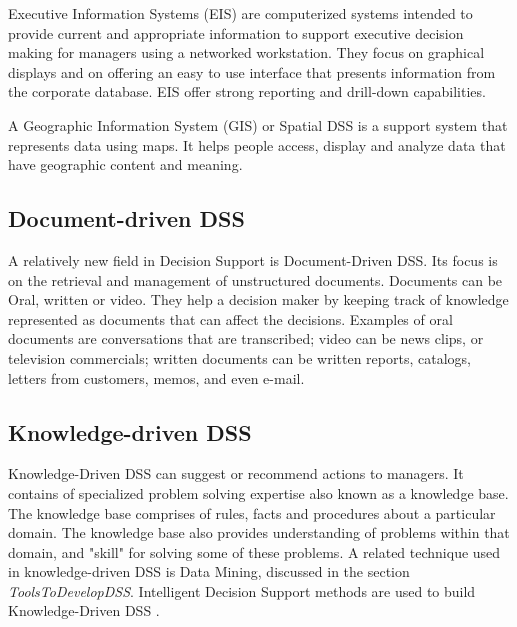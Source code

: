 \indent Executive Information Systems (EIS) are computerized systems intended to provide current and appropriate information to support executive decision making for managers using a networked workstation. They focus on graphical displays and on offering an easy to use interface that presents information from the corporate database. EIS offer strong reporting and drill-down capabilities.\cite{DDSTypes}

\indent A Geographic Information System (GIS) or Spatial DSS is a support system that represents data using maps. It helps people access, display and analyze data that have geographic content and meaning.\cite{DDSTypes}
\subsection{Document-driven DSS}
\label{subsec:DocumentDrivenDSS}
A relatively new field in Decision Support is Document-Driven DSS. Its focus is on the retrieval and management of unstructured documents. Documents can be Oral, written or video. They help a decision maker by keeping track of knowledge represented as documents that can affect the decisions.\cite{power2002building} Examples of oral documents are conversations that are transcribed; video can be news clips, or television commercials; written documents can be written reports, catalogs, letters from customers, memos, and even e-mail.\cite{DDSTypes}
\subsection{Knowledge-driven DSS}
\label{subsec:KnowledgeDrivenDSS}
Knowledge-Driven DSS can suggest or recommend actions to managers. It contains of specialized problem solving expertise also known as a knowledge base. The knowledge base comprises of rules, facts and procedures about a particular domain. The knowledge base also provides understanding of problems within that domain, and "skill" for solving some of these problems. A related technique used in knowledge-driven DSS is Data Mining, discussed in the section \textit{ToolsToDevelopDSS}. Intelligent Decision Support methods are used to build Knowledge-Driven DSS  \cite{power2002building}.
